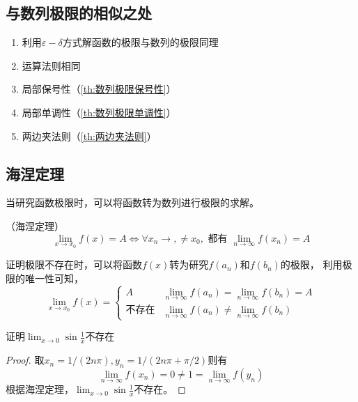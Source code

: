 \subsection{与数列极限的相似之处}
\begin{enumerate}
    \item 利用$\varepsilon-\delta$方式解函数的极限与数列的极限同理
    \item 运算法则相同
    \item 局部保号性（\ref{th:数列极限保号性}）
    \item 局部单调性（\ref{th:数列极限单调性}）
    \item 两边夹法则（\ref{th:两边夹法则}）
\end{enumerate}

\subsection{海涅定理}
当研究函数极限时，可以将函数转为数列进行极限的求解。
\begin{theorem}
    （海涅定理）
    \label{th:海涅定理}
    \[ \lim_{x\to x_0}f(x) = A \iff \forall x_n \to, \neq x_0, \text{ 都有~} \lim_{n\to\infty}f(x_n) = A \]
\end{theorem}
\begin{situation}
    证明极限不存在时，可以将函数$f(x)$转为研究$f(a_n)$和$f(b_n)$的极限，
    利用极限的唯一性可知，
    \begin{equation*}
        \lim_{x\to x_0}f(x) =
        \begin{cases}
            A             & \lim_{n\to\infty}f(a_n) = \lim_{n\to\infty}f(b_n) = A \\
            \text{不存在} & \lim_{n\to\infty}f(a_n) \neq \lim_{n\to\infty}f(b_n)
        \end{cases}
    \end{equation*}
\end{situation}
\begin{example}
    证明$\lim_{x\to 0}\sin\frac{1}{x}$不存在
\end{example}
\begin{proof}
    取$x_n=1/(2n\pi), y_n=1/(2n\pi + \pi/2)$则有
    \[ \lim_{n\to\infty}f(x_n) = 0 \neq 1 = \lim_{n\to\infty}f(y_n) \]
    根据海涅定理，$\lim_{x\to 0}\sin\frac{1}{x}$不存在。
\end{proof}

